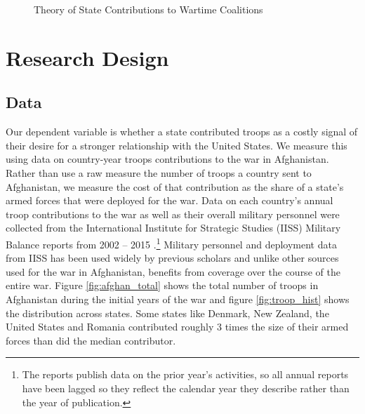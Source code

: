 \documentclass[12pt,letterpaper]{article}
\begin{document}
		\begin{figure}[H]
			\centering
			\caption{Theory of State Contributions to Wartime Coalitions}
			\label{fig:theory}
		\end{figure}

\section{Research Design}
	\subsection{Data}
		Our dependent variable is whether a state contributed troops as a costly signal of their desire for a stronger relationship with the United States. We measure this using data on country-year troops contributions to the war in Afghanistan. Rather than use a raw measure the number of troops a country sent to Afghanistan, we measure the cost of that contribution as the share of a state's armed forces that were deployed for the war. Data on each country's annual troop contributions to the war as well as their overall military personnel were collected from the International Institute for Strategic Studies (IISS) Military Balance reports from 2002 -- 2015 \citep{internationalinstituteforstrategicstudies_militarybalance_2002}.\footnote{The reports publish data on the prior year's activities, so all annual reports have been lagged so they reflect the calendar year they describe rather than the year of publication.} Military personnel and deployment data from IISS has been used widely by previous scholars \citep{walter_buildingreputationwhy_2006, rovner_hegemonyforceposture_2014, beckley_emergingmilitarybalance_2017, henke_politicsdiplomacyhow_2017} and unlike other sources used for the war in Afghanistan, benefits from coverage over the course of the entire war. Figure \ref{fig:afghan_total} shows the total number of troops in Afghanistan during the initial years of the war and figure \ref{fig:troop_hist} shows the distribution across states. Some states like Denmark, New Zealand, the United States and Romania contributed roughly 3 times the size of their armed forces than did the median contributor. 
\end{document}
